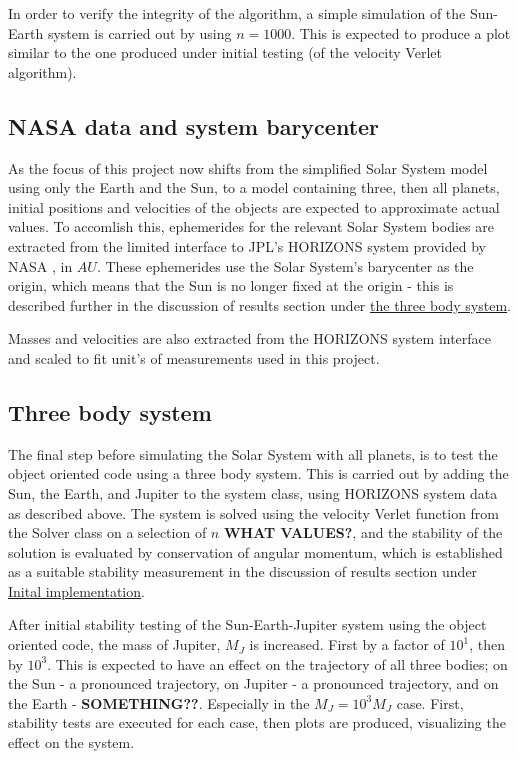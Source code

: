 \documentclass[%
oneside,                 %
final,                   %
10pt]{article}
\begin{document}
In order to verify the integrity of the algorithm, a simple simulation of the Sun-Earth system is carried out by using $n=1000$. This is expected to produce a plot similar to the one produced under initial testing (of the velocity Verlet algorithm).


\subsection{NASA data and system barycenter}
As the focus of this project now shifts from the simplified Solar System model using only the Earth and the Sun, to a model containing three, then all planets, initial positions and velocities of the objects are expected to approximate actual values. To accomlish this, ephemerides for the relevant Solar System bodies are extracted from the limited interface to JPL's HORIZONS system provided by NASA \cite{nasadata}, in $AU$. These ephemerides use the Solar System's barycenter as the origin, which means that the Sun is no longer fixed at the origin - this is described further in the discussion of results section under  \hyperref[subsec:Discofres:3B]{the three body system}.  \newline

Masses and velocities are also extracted from the HORIZONS system interface and scaled to fit unit's of measurements used in this project.

\subsection{Three body system}
\label{sec:Modmultibody}
The final step before simulating the Solar System with all planets, is to test the object oriented code using a three body system. This is carried out by adding the Sun, the Earth, and Jupiter to the system class, using HORIZONS system data as described above. The system is solved using the velocity Verlet function from the Solver class on a selection of $n$ \textbf{WHAT VALUES?}, and the stability of the solution is evaluated by conservation of angular momentum, which is established as a suitable stability measurement in the discussion of results section under \hyperref[subsec:Discofres:initimpl]{Inital implementation}. \newline

After initial stability testing of the Sun-Earth-Jupiter system using the object oriented code, the mass of Jupiter, $M_J$ is increased. First by a factor of $10^1$, then by $10^3$. This is expected to have an effect on the trajectory of all three bodies; on the Sun - a pronounced trajectory, on Jupiter - a pronounced trajectory, and on the Earth - \textbf{SOMETHING??}. Especially in the $M_J=10^3 M_J$ case. First, stability tests are executed for each case, then plots are produced, visualizing the effect on the system.
  
\end{document}

